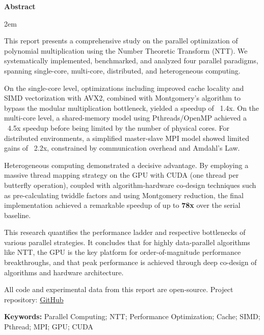 \documentclass[a4paper]{article}
\newenvironment{enabstract}{
    \par\small
    \noindent\mbox{}\par\vspace{-\baselineskip}
    \par\parindent 2em
    }
    {\par\vspace{1em}}
\begin{document}
\begin{center}{\bfseries{Abstract}}\end{center}\par\vspace{0.5em}
\begin{enabstract}
This report presents a comprehensive study on the parallel optimization of polynomial multiplication using the Number Theoretic Transform (NTT). We systematically implemented, benchmarked, and analyzed four parallel paradigms, spanning single-core, multi-core, distributed, and heterogeneous computing.

On the single-core level, optimizations including improved cache locality and SIMD vectorization with AVX2, combined with Montgomery's algorithm to bypass the modular multiplication bottleneck, yielded a speedup of ~1.4x. On the multi-core level, a shared-memory model using Pthreads/OpenMP achieved a ~4.5x speedup before being limited by the number of physical cores. For distributed environments, a simplified master-slave MPI model showed limited gains of ~2.2x, constrained by communication overhead and Amdahl's Law.

Heterogeneous computing demonstrated a decisive advantage. By employing a massive thread mapping strategy on the GPU with CUDA (one thread per butterfly operation), coupled with algorithm-hardware co-design techniques such as pre-calculating twiddle factors and using Montgomery reduction, the final implementation achieved a remarkable speedup of up to \textbf{78x} over the serial baseline.

This research quantifies the performance ladder and respective bottlenecks of various parallel strategies. It concludes that for highly data-parallel algorithms like NTT, the GPU is the key platform for order-of-magnitude performance breakthroughs, and that peak performance is achieved through deep co-design of algorithms and hardware architecture.

All code and experimental data from this report are open-source. Project repository: \href{https://github.com/aokimi0/parallel-programming}{GitHub}

\vspace{1em}
\noindent\textbf{Keywords:} Parallel Computing; NTT; Performance Optimization; Cache; SIMD; Pthread; MPI; GPU; CUDA
\end{enabstract}

\clearpage
\tableofcontents
\newpage
\end{document}
